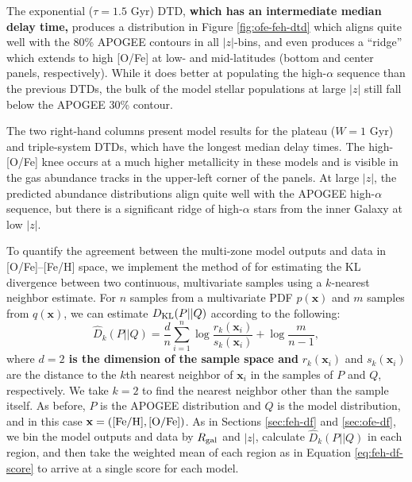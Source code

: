 \documentclass[twocolumn,twocolappendix,linenumbers]{aastex631}
\begin{document}
The exponential ($\tau=1.5$ Gyr) DTD, {\bf which has an intermediate median delay time,} produces a distribution in Figure \ref{fig:ofe-feh-dtd} which aligns quite well with the 80\% APOGEE contours in all $|z|$-bins, and even produces a ``ridge'' which extends to high [O/Fe] at low- and mid-latitudes (bottom and center panels, respectively). While it does better at populating the high-$\alpha$ sequence than the previous DTDs, the bulk of the model stellar populations at large $|z|$ still fall below the APOGEE 30\% contour. 

The two right-hand columns present model results for the plateau ($W=1$ Gyr) and triple-system DTDs, which have the longest median delay times. The high-[O/Fe] knee occurs at a much higher metallicity in these models and is visible in the gas abundance tracks in the upper-left corner of the panels. At large $|z|$, the predicted abundance distributions align quite well with the APOGEE high-$\alpha$ sequence, but there is a significant ridge of high-$\alpha$ stars from the inner Galaxy at low $|z|$.

To quantify the agreement between the multi-zone model outputs and data in [O/Fe]--[Fe/H] space, we implement the method of \citet{PerezCruz2008-KLTest2D} for estimating the KL divergence between two continuous, multivariate samples using a $k$-nearest neighbor estimate. For $n$ samples from a multivariate PDF $p(\mathbf{x})$ and $m$ samples from $q(\mathbf{x})$, we can estimate $D_{\rm KL}(P||Q)$ according to the following:
\begin{equation}
    \label{eq:2d-kl-divergence}
    \hat D_k(P||Q) = \frac dn \sum_{i=1}^n\log\frac{r_k(\mathbf{x}_i)}{s_k(\mathbf{x}_i)} + \log\frac{m}{n-1},
\end{equation}
where {\bf $d=2$ is the dimension of the sample space and} $r_k(\mathbf{x}_i)$ and $s_k(\mathbf{x}_i)$ are the distance to the $k$th nearest neighbor of $\mathbf{x}_i$ in the samples of $P$ and $Q$, respectively. We take $k=2$ to find the nearest neighbor other than the sample itself. As before, $P$ is the APOGEE distribution and $Q$ is the model distribution, and in this case $\mathbf{x}=({\rm [Fe/H]}, {\rm [O/Fe]})$.
As in Sections \ref{sec:feh-df} and \ref{sec:ofe-df}, we bin the model outputs and data by $R_{\rm gal}$ and $|z|$, calculate $\hat D_k(P||Q)$ in each region, and then take the weighted mean of each region as in Equation \ref{eq:feh-df-score} to arrive at a single score for each model.
\end{document}
